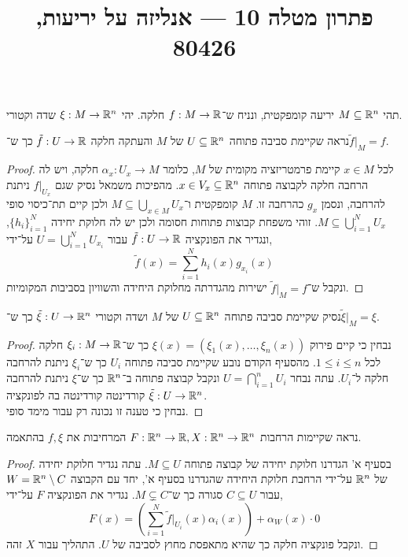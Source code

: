 
\title{פתרון מטלה 10 --- אנליזה על יריעות, 80426}

\DeclareMathOperator{\vol}{vol}


\maketitle
\maketitleprint[blue]

\question{}
תהי $M \subseteq \mathbb{R}^n$ יריעה קומפקטית, ונניח ש־$f : M \to \mathbb{R}$ חלקה.
יהי $\xi : M \to \mathbb{R}^n$ שדה וקטורי.

\subquestion{}
נראה שקיימת סביבה פתוחה $U \subseteq \mathbb{R}^n$ של $M$ והעתקה חלקה $\tilde{f} : U \to \mathbb{R}$ כך ש־$\tilde{f} |_{M} = f$.
\begin{proof}
	לכל $x \in M$ קיימת פרמטריזציה מקומית של $M$, כלומר $\alpha_x : U_x \to M$ חלקה, ויש לה הרחבה חלקה לקבוצה פתוחה $x \in V_x \subseteq \mathbb{R}^n$.
	מהפיכות משמאל נסיק שגם $f |_{U_x}$ ניתנת להרחבה, ונסמן $g_x$ כהרחבה זו.
	$M$ קומפקטית ו־$M \subseteq \bigcup_{x \in M} U_x$ ולכן קיים תת־כיסוי סופי $M \subseteq \bigcup_{i = 1}^N U_x$.
	זוהי משפחת קבוצות פתוחות חסומה ולכן יש לה חלוקת יחידה ${\{ h_i \}}_{i = 1}^N$, ונגדיר את הפונקציה $\tilde{f} : U \to \mathbb{R}$ עבור $U = \bigcup_{i = 1}^N U_{x_i}$ על־ידי,
	\[
		\tilde{f}(x)
		= \sum_{i = 1}^N h_i(x) g_{x_i}(x)
	\]
	ונקבל ש־$\tilde{f} |_M = f$ ישירות מהגדרתה מחלוקת היחידה והשוויון בסביבות המקומיות.
\end{proof}

\subquestion{}
נסיק שקיימת סביבה פתוחה $U \subseteq \mathbb{R}^n$ של $M$ ושדה וקטורי $\tilde{\xi} : U \to \mathbb{R}^n$ כך ש־$\tilde{\xi} |_M = \xi$.
\begin{proof}
	נבחין כי קיים פירוק $\xi(x) = (\xi_1(x), \ldots, \xi_n(x))$ כך ש־$\xi_i : M \to \mathbb{R}$ חלקה לכל $1 \le i \le n$.
	מהסעיף הקודם נובע שקיימת סביבה פתוחה $U_i$ כך ש־$\xi_i$ ניתנת להרחבה חלקה ל־$U_i$.
	עתה נבחר $U = \bigcap_{i = 1}^n U_i$ ונקבל קבוצה פתוחה ב־$\mathbb{R}^n$ כך ש־$\xi$ ניתנת להרחבה קורדינטה קורדינטה בה לפונקציה $\tilde{\xi} : U \to \mathbb{R}^n$. \\
	נבחין כי טענה זו נכונה רק עבור מימד סופי.
\end{proof}

\subquestion{}
נראה שקיימות הרחבות $F : \mathbb{R}^n \to \mathbb{R}, X : \mathbb{R}^n \to \mathbb{R}^n$ המרחיבות את $f, \xi$ בהתאמה.
\begin{proof}
	בסעיף א' הגדרנו חלוקת יחידה של קבוצה פתוחה $M \subseteq U$.
	עתה נגדיר חלוקת יחידה של $\mathbb{R}^n$ על־ידי הרחבת חלוקת היחידה שהגדרנו בסעיף א', יחד עם הקבוצה $W = \mathbb{R}^n \setminus C$ עבור $C \subseteq U$ סגורה כך ש־$M \subsetneq C$.
	נגדיר את הפונקציה $F$ על־ידי,
	\[
		F(x)
		= \left( \sum_{i = 1}^N \tilde{f} |_{U_i}(x) \alpha_i(x) \right) + \alpha_W(x) \cdot 0
	\]
	ונקבל פונקציה חלקה כך שהיא מתאפסת מחוץ לסביבה של $U$.
	התהליך עבור $X$ זהה.
\end{proof}

